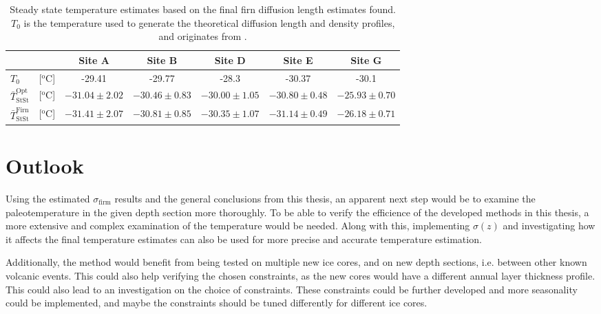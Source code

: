 \documentclass[../../CompleteThesis2/Complete_2ndDraft]{subfiles}
\begin{document}
\begin{table}[ht]
	\centering
	\begin{tabular}{l c|c|c|c|c|c}
		& & Site A & Site B & Site D & Site E & Site G \\
		\hline
		\hline
		$T_0$ & [$^{\text{o}}$C] & -29.41 & -29.77 & -28.3 & -30.37 & -30.1 \\[0.1cm]
		$\bar{T}_{\text{StSt}}^{\text{Opt}}$ & [$^{\text{o}}$C] & $-31.04 \pm 2.02$ & $-30.46 \pm 0.83$ & $-30.00 \pm 1.05$ & $-30.80 \pm 0.48$ & $-25.93 \pm 0.70$ \\[0.5cm]
		$\bar{T}_{\text{StSt}}^{\text{Firn}}$ & [$^{\text{o}}$C] & $-31.41 \pm 2.07$ & $-30.81 \pm 0.85$ & $-30.35 \pm 1.07$ & $-31.14 \pm 0.49$ & $-26.18 \pm 0.71$ \\[0.15cm]
	\end{tabular}
	\caption[Steady State Temperature Estimates]{\small Steady state temperature estimates based on the final firn diffusion length estimates found. $T_0$ is the temperature used to generate the theoretical diffusion length and density profiles, and originates from \cite[H. Clausen et al., 1988]{Clausen1988a}.}
	\label{Tab:TempResults}
\end{table}	


\section[Outlook]{Outlook}
\label{Sec:Outlook}
Using the estimated $\sigma_{\text{firm}}$ results and the general conclusions from this thesis, an apparent next step would be to examine the paleotemperature in the given depth section more thoroughly. To be able to verify the efficience of the developed methods in this thesis, a more extensive and complex examination of the temperature would be needed. 
Along with this, implementing $\sigma(z)$ and investigating how it affects the final temperature estimates can also be used for more precise and accurate temperature estimation. 

Additionally, the method would benefit from being tested on multiple new ice cores, and on new depth sections, i.e. between other known volcanic events. This could also help verifying the chosen constraints, as the new cores would have a different annual layer thickness profile. This could also lead to an investigation on the choice of constraints. These constraints could be further developed and more seasonality could be implemented, and maybe the constraints should be tuned differently for different ice cores.
\end{document}
